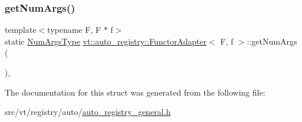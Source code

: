 \mbox{\label{structvt_1_1auto__registry_1_1_functor_adapter_a5f5e6ebbda45d5573e3b2f3da063e81b}} 
\subsubsection{\texorpdfstring{get\+Num\+Args()}{getNumArgs()}}
{\footnotesize\ttfamily template$<$typename F, F $\ast$ f$>$ \\
static \hyperlink{namespacevt_1_1auto__registry_aebda1d9d765bc9147dc654ad0712c936}{Num\+Args\+Type} \hyperlink{structvt_1_1auto__registry_1_1_functor_adapter}{vt\+::auto\+\_\+registry\+::\+Functor\+Adapter}$<$ F, f $>$\+::get\+Num\+Args (\begin{DoxyParamCaption}{ }\end{DoxyParamCaption})\hspace{0.3cm}{\ttfamily [inline]}, {\ttfamily [static]}}



The documentation for this struct was generated from the following file\+:\begin{DoxyCompactItemize}
\item 
src/vt/registry/auto/\hyperlink{auto__registry__general_8h}{auto\+\_\+registry\+\_\+general.\+h}\end{DoxyCompactItemize}

